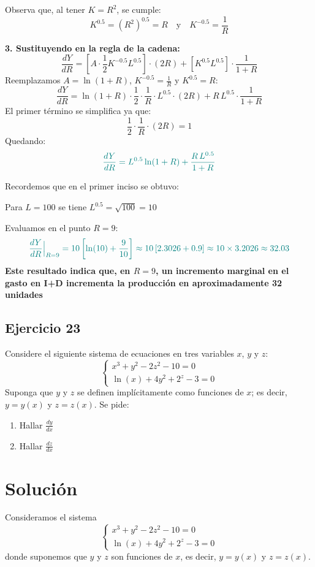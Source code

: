 \documentclass{article}
\begin{document}
Observa que, al tener \(K=R^2\), se cumple:
\[
K^{0.5} = (R^2)^{0.5} = R \quad \text{y} \quad K^{-0.5} = \frac{1}{R}
\]

\textbf{3. Sustituyendo en la regla de la cadena:}
\[
\frac{dY}{dR} = \left[ A\cdot \frac{1}{2}K^{-0.5}L^{0.5} \right]\cdot (2R) 
+ \left[K^{0.5}L^{0.5}\right]\cdot \frac{1}{1+R}
\]
Reemplazamos \(A = \ln(1+R)\), \(K^{-0.5}=\frac{1}{R}\) y \(K^{0.5}= R\):
\[
\frac{dY}{dR} = \ln(1+R)\cdot \frac{1}{2}\cdot \frac{1}{R}\cdot L^{0.5}\cdot (2R) + R\,L^{0.5}\cdot \frac{1}{1+R}
\]
El primer término se simplifica ya que:
\[
\frac{1}{2}\cdot \frac{1}{R}\cdot (2R) = 1
\]
Quedando:
\[ \color{teal}
\frac{dY}{dR} = L^{0.5}\ln(1+R) + \frac{R\,L^{0.5}}{1+R}
\]

 Recordemos que en el primer inciso se obtuvo:

Para \(L=100\) se tiene \(L^{0.5}=\sqrt{100}=10\)

Evaluamos en el punto \(R=9\):
\[ \color{teal}
\frac{dY}{dR}\Big|_{R=9} = 10\left[\ln(10) + \frac{9}{10}\right]
\approx 10\left[2.3026+0.9\right] \approx 10\times 3.2026 \approx 32.03
\]
\textbf{\color{teal}
Este resultado indica que, en \(R=9\), un incremento marginal en el gasto en I+D incrementa la producción en aproximadamente 32 unidades
}

\newpage

\subsection{Ejercicio 23}
Considere el siguiente sistema de ecuaciones en tres variables \(x\), \(y\) y \(z\):
\[
\begin{cases}
x^3 + y^2 - 2z^2 - 10 = 0 \\
\ln(x) + 4y^2 + 2^z - 3 = 0
\end{cases}
\]
Suponga que \(y\) y \(z\) se definen implícitamente como funciones de \(x\); es decir, \(y = y(x)\) y \(z = z(x)\). Se pide:
\begin{enumerate}
    \item Hallar \(\displaystyle \frac{dy}{dx}\)
    \item Hallar \(\displaystyle \frac{dz}{dx}\)
\end{enumerate}
\newpage
\section*{Solución}


Consideramos el sistema
\begin{equation*}
\begin{cases}
x^3 + y^2 - 2z^2 - 10 = 0 \\
\ln(x) + 4y^2 + 2^z - 3 = 0
\end{cases}
\end{equation*}
donde suponemos que \( y \) y \( z \) son funciones de \( x \), es decir, \( y=y(x) \) y \( z=z(x) \).
\end{document}
